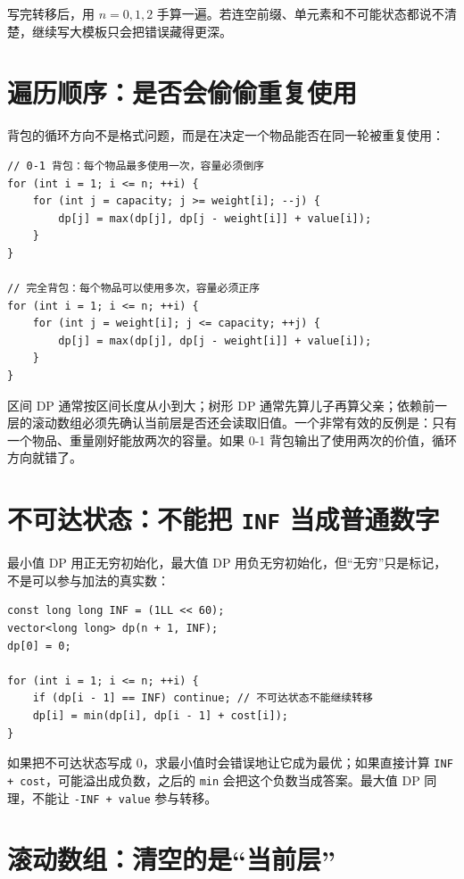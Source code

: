 \documentclass[UTF8,openany,oneside,zihao=-4]{ctexbook}
\begin{document}
\begin{note}
 写完转移后，用 $n=0,1,2$ 手算一遍。若连空前缀、单元素和不可能状态都说不清楚，继续写大模板只会把错误藏得更深。
\end{note}

\section{遍历顺序：是否会偷偷重复使用}

背包的循环方向不是格式问题，而是在决定一个物品能否在同一轮被重复使用：

\begin{lstlisting}
// 0-1 背包：每个物品最多使用一次，容量必须倒序
for (int i = 1; i <= n; ++i) {
    for (int j = capacity; j >= weight[i]; --j) {
        dp[j] = max(dp[j], dp[j - weight[i]] + value[i]);
    }
}

// 完全背包：每个物品可以使用多次，容量必须正序
for (int i = 1; i <= n; ++i) {
    for (int j = weight[i]; j <= capacity; ++j) {
        dp[j] = max(dp[j], dp[j - weight[i]] + value[i]);
    }
}
\end{lstlisting}

区间 DP 通常按区间长度从小到大；树形 DP 通常先算儿子再算父亲；依赖前一层的滚动数组必须先确认当前层是否还会读取旧值。一个非常有效的反例是：只有一个物品、重量刚好能放两次的容量。如果 0-1 背包输出了使用两次的价值，循环方向就错了。

\section{不可达状态：不能把 \lstinline|INF| 当成普通数字}

最小值 DP 用正无穷初始化，最大值 DP 用负无穷初始化，但“无穷”只是标记，不是可以参与加法的真实数：

\begin{lstlisting}
const long long INF = (1LL << 60);
vector<long long> dp(n + 1, INF);
dp[0] = 0;

for (int i = 1; i <= n; ++i) {
    if (dp[i - 1] == INF) continue; // 不可达状态不能继续转移
    dp[i] = min(dp[i], dp[i - 1] + cost[i]);
}
\end{lstlisting}

如果把不可达状态写成 0，求最小值时会错误地让它成为最优；如果直接计算 \lstinline|INF + cost|，可能溢出成负数，之后的 \lstinline|min| 会把这个负数当成答案。最大值 DP 同理，不能让 \lstinline|-INF + value| 参与转移。

\section{滚动数组：清空的是“当前层”}
\end{document}
